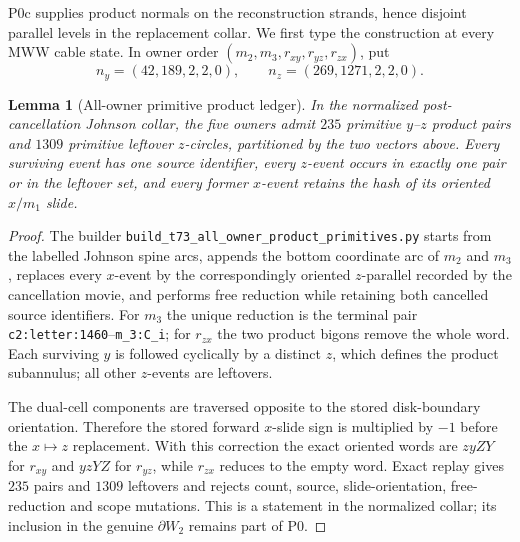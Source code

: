 \documentclass[11pt]{amsart}
\newtheorem{lemma}[theorem]{Lemma}
\theoremstyle{definition}
\theoremstyle{remark}
\begin{document}
P0c supplies product normals on the reconstruction strands, hence disjoint
parallel levels in the replacement collar.  We first type the construction at every MWW
cable state.  In owner order $(m_2,m_3,r_{xy},r_{yz},r_{zx})$, put
\[
n_y=(42,189,2,2,0),\qquad n_z=(269,1271,2,2,0).
\]

\begin{lemma}[All-owner primitive product ledger]
\label{lem:all-owner-products}
In the normalized post-cancellation Johnson collar, the five owners admit
$235$ primitive $y$--$z$ product pairs and $1309$ primitive leftover
$z$-circles, partitioned by the two vectors above.  Every surviving event has
one source identifier, every $z$-event occurs in exactly one pair or in the
leftover set, and every former $x$-event retains the hash of its oriented
$x/m_1$ slide.
\end{lemma}

\begin{proof}
The builder \texttt{build\_t73\_all\_owner\_product\_primitives.py} starts
from the labelled Johnson spine arcs, appends the bottom coordinate arc of
$m_2$ and $m_3$, replaces every $x$-event by the correspondingly oriented
$z$-parallel recorded by the cancellation movie, and performs free reduction
while retaining both cancelled source identifiers.  For $m_3$ the unique
reduction is the terminal pair
\texttt{c2:letter:1460}--\texttt{m\_3:C\_i}; for $r_{zx}$ the two product
bigons remove the whole word.  Each surviving $y$ is followed cyclically by
a distinct $z$, which defines the product subannulus; all other $z$-events are
leftovers.

The dual-cell components are traversed opposite to the stored disk-boundary
orientation.  Therefore the stored forward $x$-slide sign is multiplied by
$-1$ before the $x\mapsto z$ replacement.  With this correction the exact
oriented words are $zyZY$ for $r_{xy}$ and $yzYZ$ for $r_{yz}$, while
$r_{zx}$ reduces to the empty word.  Exact replay gives $235$ pairs and
$1309$ leftovers and rejects count, source, slide-orientation, free-reduction
and scope mutations.  This is a statement in the normalized collar; its
inclusion in the genuine $\partial W_2$ remains part of P0.
\end{proof}
\end{document}
